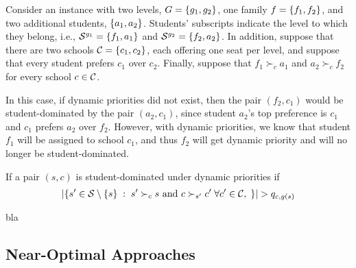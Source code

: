         \begin{example}
          Consider an instance with two levels, \(G = \left\{g_1, g_2\right\}\), one family \(f = \left\{f_1, f_2\right\}\), and two additional students, \(\left\{a_1, a_2\right\}\). Students' subscripts indicate the level to which they belong, i.e., \(\mathcal{S}^{g_1} = \left\{f_1, a_1\right\}\) and \(\mathcal{S}^{g_2} = \left\{f_2, a_2\right\}\). In addition, suppose that there are two schools \(\mathcal{C} = \left\{c_1, c_2\right\}\), each offering one seat per level, and suppose that every student prefers \(c_1\) over \(c_2\). Finally, suppose that \(f_1 \succ_c a_1\) and \(a_2 \succ_c f_2\) for every school \(c\in \mathcal{C}\).

          In this case, if dynamic priorities did not exist, then the pair \((f_2, c_1)\) would be student-dominated by the pair \((a_2, c_1)\), since student \(a_2\)'s top preference is \(c_1\) and \(c_1\) prefers \(a_2\) over \(f_2\). However, with dynamic priorities, we know that student \(f_1\) will be assigned to school \(c_1\), and thus \(f_2\) will get dynamic priority and will no longer be student-dominated.
        \end{example}

        \begin{proposition}
          If a pair \((s,c)\) is student-dominated under dynamic priorities if
          \[
          \left|\left\{s'\in \mathcal{S}\setminus \left\{s\right\} \;:\; s' \succ_{c} s \text{ and } c\succ_{s'} c' \; \forall c'\in \mathcal{C}, \; \right\}\right| > q_{c,g(s)}
          \]
        \end{proposition}



        \begin{algorithm}
          bla
        \end{algorithm}

    \subsection{Near-Optimal Approaches}\label{subsec: near optimal heuristics}

